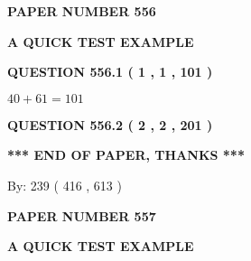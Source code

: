 \documentclass[12pt]{article}
\begin{document}
   
 {\textbf{ \Large{ PAPER NUMBER  556  }}}
   
   
\vspace{0.2in}
   
   
   
   
   
   
 \vspace{0.2in}
{\LARGE {\textbf{ A QUICK TEST EXAMPLE}}}
   
   
  
\vspace{0.2in}
  
{\textbf{\Large{QUESTION
556.1 
 ( 1 , 1 , 101 )
}}}
  
  
 
 

$ %
40 +  %
61=   %
101$
 
 
  
\vspace{0.2in}
  
{\textbf{\Large{QUESTION
556.2 
 ( 2 , 2 , 201 )
}}}
  
  
   
   
 \vspace{0.2in}
 
   
   
   
   
\vspace{1.0in} 
{\textbf{\large{ *** END OF PAPER, THANKS *** }}} 
   
   
\hspace{1.0in} By: 
 239 ( 416 ,  613 )
   
   
   
   
\newpage 
\setcounter{page}{ 
   557001 } 
   
   
   
   
 {\textbf{ \Large{ PAPER NUMBER  557  }}}
   
   
\vspace{0.2in}
   
   
   
   
   
   
 \vspace{0.2in}
{\LARGE {\textbf{ A QUICK TEST EXAMPLE}}}
   
   
  
\vspace{0.2in}
  
\end{document}
